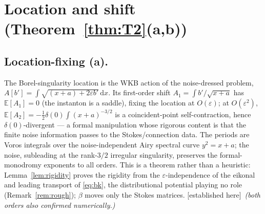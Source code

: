\documentclass[11pt,reqno]{amsart}
\theoremstyle{plain}
\theoremstyle{definition}
\theoremstyle{remark}
\newcommand{\dd}{\,\mathrm{d}}
\newcommand{\E}{\mathbb{E}}
\newcommand{\eps}{\varepsilon}
\newcommand{\tagPr}{{\footnotesize\textsf{[established here]}}}
\begin{document}
\section{Location and shift (Theorem~\ref{thm:T2}(a,b))}\label{sec:T2proof}

\subsection{Location-fixing (a).}
The Borel-singularity location is the WKB action of the noise-dressed problem,
$A[b']=\int\sqrt{(x+a)+2\eps b'}\dd x$. Its first-order shift $A_1=\int b'/\sqrt{x+a}$ has
$\E[A_1]=0$ (the instanton is a saddle), fixing the location at $O(\eps)$; at $O(\eps^2)$,
$\E[A_2]=-\tfrac12\delta(0)\int(x+a)^{-3/2}$ is a coincident-point self-contraction, hence
$\delta(0)$-divergent --- a formal manipulation whose rigorous content is that the finite noise
information passes to the Stokes/connection data. The
periods are Voros integrals over the noise-independent Airy spectral curve $y^2=x+a$; the noise,
subleading at the rank-$3/2$ irregular singularity, preserves the formal-monodromy exponents to all
orders. This is a theorem rather than a heuristic: Lemma~\ref{lem:rigidity} proves the rigidity from
the $\eps$-independence of the eikonal and leading transport of \eqref{eq:bk}, the distributional
potential playing no role (Remark~\ref{rem:rough}); $\beta$ moves only the Stokes matrices. \tagPr\
\emph{(both orders also confirmed numerically.)}
\end{document}
